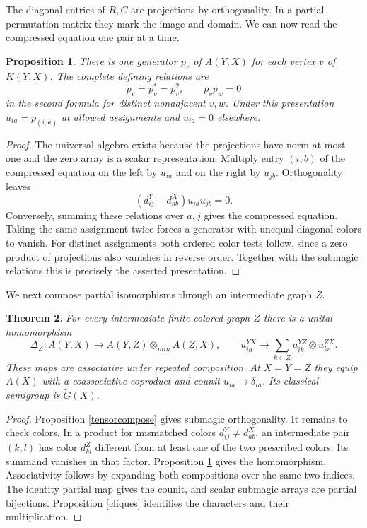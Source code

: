 \documentclass[11pt,a4paper]{article}
\newtheorem{thm}{Theorem}[section]
\newtheorem{prop}[thm]{Proposition}
\begin{document}
The diagonal entries of $R,C$ are projections by orthogonality. In a partial permutation matrix they mark the image and domain. We can now read the compressed equation one pair at a time.

\begin{prop}\label{local}
There is one generator $p_v$ of $A(Y,X)$ for each vertex $v$ of $K(Y,X)$. The complete defining relations are
\[
 p_v=p_v^*=p_v^2,\qquad p_vp_w=0
\]
in the second formula for distinct nonadjacent $v,w$. Under this presentation $u_{ia}=p_{(i,a)}$ at allowed assignments and $u_{ia}=0$ elsewhere.
\end{prop}
\begin{proof}
The universal algebra exists because the projections have norm at most one and the zero array is a scalar representation. Multiply entry $(i,b)$ of the compressed equation on the left by $u_{ia}$ and on the right by $u_{jb}$. Orthogonality leaves
\[
 (d^Y_{ij}-d^X_{ab})u_{ia}u_{jb}=0 .
\]
Conversely, summing these relations over $a,j$ gives the compressed equation. Taking the same assignment twice forces a generator with unequal diagonal colors to vanish. For distinct assignments both ordered color tests follow, since a zero product of projections also vanishes in reverse order. Together with the submagic relations this is precisely the asserted presentation.
\end{proof}

We next compose partial isomorphisms through an intermediate graph $Z$.

\begin{thm}\label{composition}
For every intermediate finite colored graph $Z$ there is a unital homomorphism
\[
 \Delta_Z:A(Y,X)\to A(Y,Z)\otimes_{min} A(Z,X),
 \qquad u^{YX}_{ia}\to\sum_{k\in Z}u^{YZ}_{ik}\otimes u^{ZX}_{ka}.
\]
These maps are associative under repeated composition. At $X=Y=Z$ they equip $A(X)$ with a coassociative coproduct and counit $u_{ia}\to\delta_{ia}$. Its classical semigroup is $\widetilde G(X)$.
\end{thm}
\begin{proof}
Proposition \ref{tensorcompose} gives submagic orthogonality. It remains to check colors. In a product for mismatched colors $d^Y_{ij}\ne d^X_{ab}$, an intermediate pair $(k,l)$ has color $d^Z_{kl}$ different from at least one of the two prescribed colors. Its summand vanishes in that factor. Proposition \ref{local} gives the homomorphism. Associativity follows by expanding both compositions over the same two indices. The identity partial map gives the counit, and scalar submagic arrays are partial bijections. Proposition \ref{cliques} identifies the characters and their multiplication.
\end{proof}
\end{document}
